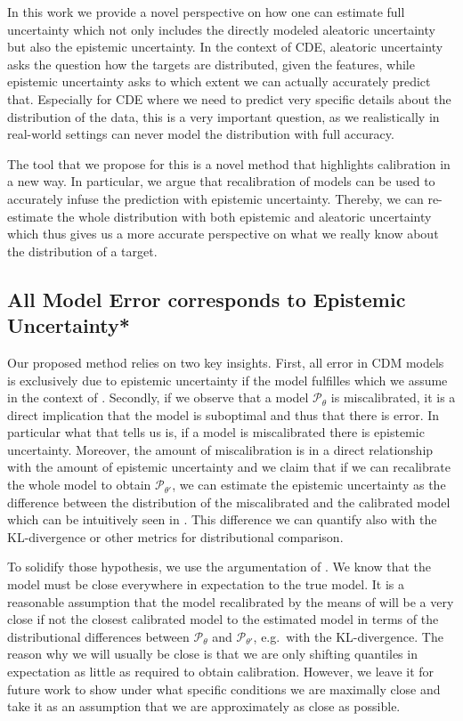 In this work we provide a novel perspective on how one can estimate full uncertainty which not only includes the directly modeled aleatoric uncertainty but also the epistemic uncertainty. In the context of CDE, aleatoric uncertainty asks the question how the targets are distributed, given the features, while epistemic uncertainty asks to which extent we can actually accurately predict that. Especially for CDE where we need to predict very specific details about the distribution of the data, this is a very important question, as we realistically in real-world settings can never model the distribution with full accuracy.

The tool that we propose for this is a novel method that highlights calibration in a new way. In particular, we argue that recalibration of models can be used to accurately infuse the prediction with epistemic uncertainty. Thereby, we can re-estimate the whole distribution with both epistemic and aleatoric uncertainty which thus gives us a more accurate perspective on what we really know about the distribution of a target.

\subsection{All Model Error corresponds to Epistemic Uncertainty*}\label{sec:uncertainty_calibration_connection}

Our proposed method relies on two key insights. First, all error in CDM models is exclusively due to epistemic uncertainty if the model fulfilles  which we assume in the context of . Secondly, if we observe that a model $\mathscr{P}_\theta$ is miscalibrated, it is a direct implication that the model is suboptimal and thus that there is error. In particular what that tells us is, if a model is miscalibrated there is epistemic uncertainty. Moreover, the amount of miscalibration is in a direct relationship with the amount of epistemic uncertainty and we claim that if we can recalibrate the whole model to obtain $\mathscr{P}_{\theta'}$, we can estimate the epistemic uncertainty as the difference between the distribution of the miscalibrated and the calibrated model which can be intuitively seen in . This difference we can quantify also with the KL-divergence or other metrics for distributional comparison.

To solidify those hypothesis, we use the argumentation of . We know that the model must be close everywhere in expectation to the true model. It is a reasonable assumption that the model recalibrated by the means of  will be a very close if not the closest calibrated model to the estimated model in terms of the distributional differences between $\mathscr{P}_\theta$ and $\mathscr{P}_{\theta'}$, e.g.\ with the KL-divergence. The reason why we will usually be close is that we are only shifting quantiles in expectation as little as required to obtain calibration. However, we leave it for future work to show under what specific conditions we are maximally close and take it as an assumption that we are approximately as close as possible.

